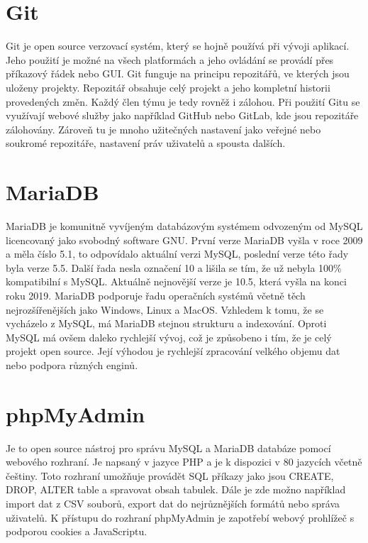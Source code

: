 \section{Git}

Git je open source verzovací systém, který se hojně používá při vývoji aplikací. Jeho použití je možné na všech platformách a jeho ovládání se provádí přes příkazový řádek nebo GUI. Git funguje na principu repozitářů, ve kterých jsou uloženy projekty. Repozitář obsahuje celý projekt a jeho kompletní historii provedených změn. Každý člen týmu je tedy rovněž i zálohou. Při použití Gitu se využívají webové služby jako například GitHub nebo GitLab, kde jsou repozitáře zálohovány. Zároveň tu je mnoho užitečných nastavení jako veřejné nebo soukromé repozitáře, nastavení práv uživatelů a spousta dalších.

\newpage

\section{MariaDB}

MariaDB je komunitně vyvíjeným databázovým systémem odvozeným od MySQL licencovaný jako svobodný software GNU. První verze MariaDB vyšla v roce 2009 a měla číslo 5.1, to odpovídalo aktuální verzi MySQL, poslední verze této řady byla verze 5.5. Další řada nesla označení 10 a lišila se tím, že už nebyla 100\% kompatibilní s MySQL. Aktuálně nejnovější verze je 10.5, která vyšla na konci roku 2019. MariaDB podporuje řadu operačních systémů včetně těch nejrozšířenějších jako Windows, Linux a MacOS. Vzhledem k tomu, že se vycházelo z MySQL, má MariaDB stejnou strukturu a indexování. Oproti MySQL má ovšem daleko rychlejší vývoj, což je způsobeno i tím, že je celý projekt open source. Její výhodou je rychlejší zpracování velkého objemu dat nebo podpora různých enginů. 

\section{phpMyAdmin}

Je to open source nástroj pro správu MySQL a MariaDB databáze pomocí webového rozhraní. Je napsaný v jazyce PHP a je k dispozici v 80 jazycích včetně češtiny. Toto rozhraní umožňuje provádět SQL příkazy jako jsou CREATE, DROP, ALTER table a spravovat obsah tabulek. Dále je zde možno například import dat z CSV souborů, export dat do nejrůznějších formátů nebo správa uživatelů. K přístupu do rozhraní phpMyAdmin je zapotřebí webový prohlížeč s podporou cookies a JavaScriptu.




\textbf{}
\textit{}



















